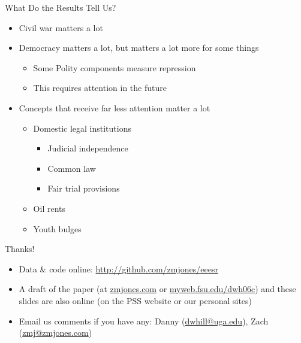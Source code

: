 \documentclass{beamer}
\begin{document}
\begin{frame}{What Do the Results Tell Us?}
  \begin{itemize}
  \item Civil war matters a lot
  \item Democracy matters a lot, but matters a lot more for some things
    \begin{itemize}
    \item Some Polity components measure repression
    \item This requires attention in the future
    \end{itemize}
  \item Concepts that receive far less attention matter a lot
    \begin{itemize}
    \item Domestic legal institutions 
      \begin{itemize}
      \item Judicial independence
      \item Common law
      \item Fair trial provisions
      \end{itemize}
    \item Oil rents
    \item Youth bulges
    \end{itemize}
  \end{itemize} 
\end{frame}

\begin{frame}{Thanks!}
  \begin{itemize}
  \item Data \& code online: \url{http://github.com/zmjones/eeesr}
  \item A draft of the paper (at \href{http://zmjones.com}{zmjones.com} or \href{http://myweb.fsu.edu/dwh06c}{myweb.fsu.edu/dwh06c}) and these slides are also online (on the PSS website or our personal sites)
  \item Email us comments if you have any: Danny (\href{mailto:dwhill@uga.edu}{dwhill@uga.edu}), Zach (\href{mailto:zmj@zmjones.com}{zmj@zmjones.com})
  \end{itemize}
\end{frame}
\end{document}
